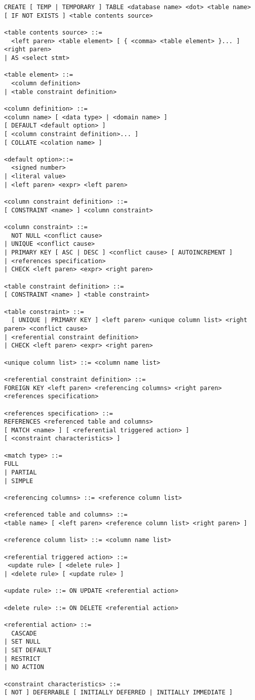 \begin{verbatim}
CREATE [ TEMP | TEMPORARY ] TABLE <database name> <dot> <table name> 
[ IF NOT EXISTS ] <table contents source>

<table contents source> ::=
  <left paren> <table element> [ { <comma> <table element> }... ] <right paren>
| AS <select stmt>

<table element> ::=
  <column definition>
| <table constraint definition>

<column definition> ::=
<column name> [ <data type> | <domain name> ]
[ DEFAULT <default option> ]
[ <column constraint definition>... ]
[ COLLATE <colation name> ]

<default option>::=
  <signed number>
| <literal value>
| <left paren> <expr> <left paren>
  
<column constraint definition> ::=
[ CONSTRAINT <name> ] <column constraint>

<column constraint> ::=
  NOT NULL <conflict cause>
| UNIQUE <conflict cause>
| PRIMARY KEY [ ASC | DESC ] <conflict cause> [ AUTOINCREMENT ]
| <references specification>
| CHECK <left paren> <expr> <right paren>

<table constraint definition> ::=
[ CONSTRAINT <name> ] <table constraint>

<table constraint> ::=
  [ UNIQUE | PRIMARY KEY ] <left paren> <unique column list> <right paren> <conflict cause>
| <referential constraint definition>
| CHECK <left paren> <expr> <right paren>

<unique column list> ::= <column name list>

<referential constraint definition> ::=
FOREIGN KEY <left paren> <referencing columns> <right paren>
<references specification>

<references specification> ::=
REFERENCES <referenced table and columns>
[ MATCH <name> ] [ <referential triggered action> ]
[ <constraint characteristics> ]

<match type> ::=
FULL
| PARTIAL
| SIMPLE

<referencing columns> ::= <reference column list>

<referenced table and columns> ::=
<table name> [ <left paren> <reference column list> <right paren> ]

<reference column list> ::= <column name list>

<referential triggered action> ::=
 <update rule> [ <delete rule> ]
| <delete rule> [ <update rule> ]

<update rule> ::= ON UPDATE <referential action>

<delete rule> ::= ON DELETE <referential action>

<referential action> ::=
  CASCADE
| SET NULL
| SET DEFAULT
| RESTRICT
| NO ACTION

<constraint characteristics> ::=
[ NOT ] DEFERRABLE [ INITIALLY DEFERRED | INITIALLY IMMEDIATE ]

\end{verbatim}

